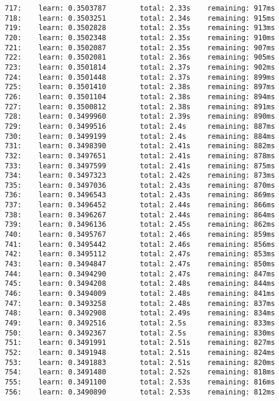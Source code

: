 \documentclass[11pt]{article}
\begin{document}
\begin{Verbatim}[commandchars=\\\{\}]
717:    learn: 0.3503787        total: 2.33s    remaining: 917ms
718:    learn: 0.3503251        total: 2.34s    remaining: 915ms
719:    learn: 0.3502828        total: 2.35s    remaining: 913ms
720:    learn: 0.3502348        total: 2.35s    remaining: 910ms
721:    learn: 0.3502087        total: 2.35s    remaining: 907ms
722:    learn: 0.3502081        total: 2.36s    remaining: 905ms
723:    learn: 0.3501814        total: 2.37s    remaining: 902ms
724:    learn: 0.3501448        total: 2.37s    remaining: 899ms
725:    learn: 0.3501410        total: 2.38s    remaining: 897ms
726:    learn: 0.3501104        total: 2.38s    remaining: 894ms
727:    learn: 0.3500812        total: 2.38s    remaining: 891ms
728:    learn: 0.3499960        total: 2.39s    remaining: 890ms
729:    learn: 0.3499516        total: 2.4s     remaining: 887ms
730:    learn: 0.3499199        total: 2.4s     remaining: 884ms
731:    learn: 0.3498390        total: 2.41s    remaining: 882ms
732:    learn: 0.3497651        total: 2.41s    remaining: 878ms
733:    learn: 0.3497599        total: 2.41s    remaining: 875ms
734:    learn: 0.3497323        total: 2.42s    remaining: 873ms
735:    learn: 0.3497036        total: 2.43s    remaining: 870ms
736:    learn: 0.3496543        total: 2.43s    remaining: 869ms
737:    learn: 0.3496452        total: 2.44s    remaining: 866ms
738:    learn: 0.3496267        total: 2.44s    remaining: 864ms
739:    learn: 0.3496136        total: 2.45s    remaining: 862ms
740:    learn: 0.3495767        total: 2.46s    remaining: 859ms
741:    learn: 0.3495442        total: 2.46s    remaining: 856ms
742:    learn: 0.3495112        total: 2.47s    remaining: 853ms
743:    learn: 0.3494847        total: 2.47s    remaining: 850ms
744:    learn: 0.3494290        total: 2.47s    remaining: 847ms
745:    learn: 0.3494208        total: 2.48s    remaining: 844ms
746:    learn: 0.3494009        total: 2.48s    remaining: 841ms
747:    learn: 0.3493258        total: 2.48s    remaining: 837ms
748:    learn: 0.3492908        total: 2.49s    remaining: 834ms
749:    learn: 0.3492516        total: 2.5s     remaining: 833ms
750:    learn: 0.3492367        total: 2.5s     remaining: 830ms
751:    learn: 0.3491991        total: 2.51s    remaining: 827ms
752:    learn: 0.3491948        total: 2.51s    remaining: 824ms
753:    learn: 0.3491883        total: 2.51s    remaining: 820ms
754:    learn: 0.3491480        total: 2.52s    remaining: 818ms
755:    learn: 0.3491100        total: 2.53s    remaining: 816ms
756:    learn: 0.3490890        total: 2.53s    remaining: 812ms

\end{Verbatim}
\end{document}
